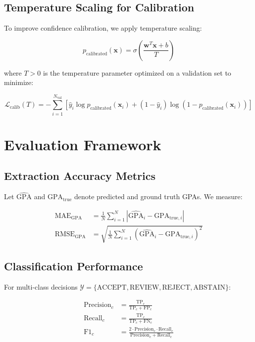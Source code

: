 \documentclass[11pt]{article}
\begin{document}
\subsection{Temperature Scaling for Calibration}
To improve confidence calibration, we apply temperature scaling:

\begin{equation}
p_{\text{calibrated}}(\mathbf{x}) = \sigma\left(\frac{\mathbf{w}^T\mathbf{x} + b}{T}\right)
\end{equation}

where $T > 0$ is the temperature parameter optimized on a validation set to minimize:

\begin{equation}
\mathcal{L}_{\text{calib}}(T) = -\sum_{i=1}^{N_{\text{val}}} \left[ \hat{y}_i \log p_{\text{calibrated}}(\mathbf{x}_i) + (1-\hat{y}_i) \log(1-p_{\text{calibrated}}(\mathbf{x}_i)) \right]
\end{equation}

\section{Evaluation Framework}

\subsection{Extraction Accuracy Metrics}
Let $\hat{\text{GPA}}$ and $\text{GPA}_{\text{true}}$ denote predicted and ground truth GPAs. We measure:

\begin{align}
\text{MAE}_{\text{GPA}} &= \frac{1}{N} \sum_{i=1}^{N} |\hat{\text{GPA}}_i - \text{GPA}_{\text{true},i}| \\
\text{RMSE}_{\text{GPA}} &= \sqrt{\frac{1}{N} \sum_{i=1}^{N} (\hat{\text{GPA}}_i - \text{GPA}_{\text{true},i})^2}
\end{align}

\subsection{Classification Performance}
For multi-class decisions $\mathcal{Y} = \{\text{ACCEPT}, \text{REVIEW}, \text{REJECT}, \text{ABSTAIN}\}$:

\begin{align}
\text{Precision}_c &= \frac{\text{TP}_c}{\text{TP}_c + \text{FP}_c} \\
\text{Recall}_c &= \frac{\text{TP}_c}{\text{TP}_c + \text{FN}_c} \\
\text{F1}_c &= \frac{2 \cdot \text{Precision}_c \cdot \text{Recall}_c}{\text{Precision}_c + \text{Recall}_c}
\end{align}
\end{document}
